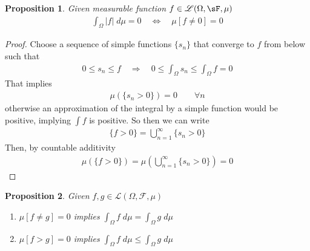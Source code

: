 \documentclass[12pt]{article}
\theoremstyle{plain}
\newtheorem{thm}{Theorem}[section]
\newtheorem{prop}[thm]{Proposition}
\theoremstyle{definition}
\theoremstyle{remark}
\begin{document}
\begin{prop}
Given measurable function $f\in\mathscr{L}(\Omega,\sF,\mu)$
\begin{align*}
  \int_\Omega |f| \; d\mu = 0
  \quad\iff\quad
  \mu[f\neq 0] = 0
\end{align*}
\end{prop}
\begin{proof}
Choose a sequence of simple functions $\{s_n\}$ that converge to $f$
from below such that
\begin{align*}
  0 \leq s_n \leq f
  \quad\Rightarrow\quad
  0 \leq \int_\Omega s_n \leq \int_\Omega f = 0
\end{align*}
That implies
\begin{align*}
  \mu\left(\{s_n > 0 \}\right) = 0
  \qquad \forall n
\end{align*}
otherwise an approximation of the integral by a simple function would be
positive, implying $\int f$ is positive. So then we can write
\begin{align*}
  \{f>0\} =
  \bigcup^\infty_{n=1} \{s_n>0\}
\end{align*}
Then, by countable additivity
\begin{align*}
    \mu\left(\{f>0 \} \right)=
    \mu\left(\bigcup^\infty_{n=1} \{ s_n>0 \}
    \right) = 0
\end{align*}
\end{proof}


\begin{prop}
Given $f,g\in\mathscr{L}(\Omega,\mathscr{F},\mu)$
\begin{enumerate}
  \item $\mu[f\neq g] = 0$
    implies
    $\int_\Omega f \; d\mu = \int_\Omega g \; d\mu$
  \item $\mu[f > g] = 0$ implies
    $\int_\Omega f \; d\mu \leq \int_\Omega g \; d\mu$
\end{enumerate}
\end{prop}
\end{document}
